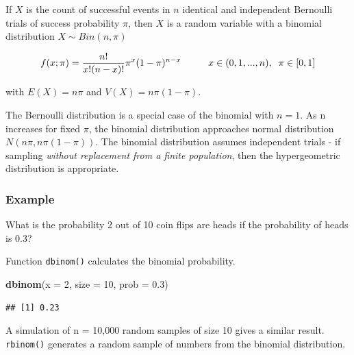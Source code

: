 \documentclass[
]{book}
\newenvironment{Shaded}{\begin{snugshade}}{\end{snugshade}}
\newcommand{\DataTypeTok}[1]{\textcolor[rgb]{0.13,0.29,0.53}{#1}}
\newcommand{\DecValTok}[1]{\textcolor[rgb]{0.00,0.00,0.81}{#1}}
\newcommand{\FloatTok}[1]{\textcolor[rgb]{0.00,0.00,0.81}{#1}}
\newcommand{\KeywordTok}[1]{\textcolor[rgb]{0.13,0.29,0.53}{\textbf{#1}}}
\newcommand{\NormalTok}[1]{#1}
\begin{document}
If \(X\) is the count of successful events in \(n\) identical and independent Bernoulli trials of success probability \(\pi\), then \(X\) is a random variable with a binomial distribution \(X \sim Bin(n,\pi)\)

\[f(x;\pi) = \frac{n!}{x!(n-x)!} \pi^x (1-\pi)^{n-x} \hspace{1cm} x \in (0, 1, ..., n), \hspace{2mm} \pi \in [0, 1]\]

with \(E(X)=n\pi\) and \(V(X) = n\pi(1-\pi)\).

The Bernoulli distribution is a special case of the binomial with \(n = 1\). As n increases for fixed \(\pi\), the binomial distribution approaches normal distribution \(N(n\pi, n\pi(1−\pi))\). The binomial distribution assumes independent trials - if sampling \emph{without replacement from a finite population}, then the hypergeometric distribution is appropriate.

\hypertarget{example}{%
\subsubsection*{Example}\label{example}}

What is the probability 2 out of 10 coin flips are heads if the probability of heads is 0.3?

Function \texttt{dbinom()} calculates the binomial probability.

\begin{Shaded}
\begin{Highlighting}[]
\KeywordTok{dbinom}\NormalTok{(}\DataTypeTok{x =} \DecValTok{2}\NormalTok{, }\DataTypeTok{size =} \DecValTok{10}\NormalTok{, }\DataTypeTok{prob =} \FloatTok{0.3}\NormalTok{)}
\end{Highlighting}
\end{Shaded}

\begin{verbatim}
## [1] 0.23
\end{verbatim}

A simulation of n = 10,000 random samples of size 10 gives a similar result. \texttt{rbinom()} generates a random sample of numbers from the binomial distribution.
\end{document}
